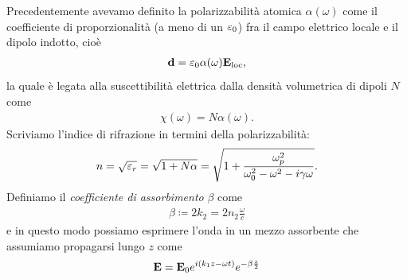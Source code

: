 Precedentemente avevamo definito la polarizzabilità atomica $ \alpha(\omega) $ come il coefficiente di proporzionalità (a meno di un $ \varepsilon_0 $) fra il 
campo elettrico locale e il dipolo indotto, cioè
\begin{align}
  \mathbf{d} = \varepsilon_0 \alpha(\omega) \mathbf{E}_{\text{loc}},
\end{align}
la quale è legata alla suscettibilità elettrica dalla densità volumetrica di dipoli $ N $ come 
\begin{align}
  \chi(\omega) = N \alpha(\omega).
\end{align}
Scriviamo l'indice di rifrazione in termini della polarizzabilità:
\begin{align}
  n = \sqrt{\varepsilon_r} = \sqrt{1 + N\alpha} = \sqrt{1 + \frac{\omega_p^2}{\omega_0^2 - \omega^2 - i \gamma \omega}}.
\end{align}
Definiamo il \textit{coefficiente di assorbimento} $ \beta $ come 
\begin{align}
  \beta \coloneq 2 k_2 = 2 n_2 \frac{\omega}{c}
\end{align}
e in questo modo possiamo esprimere l'onda in un mezzo assorbente che assumiamo propagarsi lungo $ z $ come
\begin{align}
  \mathbf{E} = \mathbf{E}_0 e^{i (k_1 z - \omega t)} e^{ - \beta \frac{z}{2}}
\end{align}

